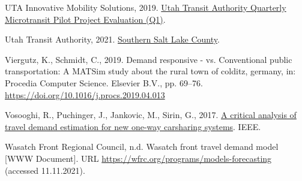 \documentclass[
]{report}
\newlength{\cslhangindent}
\newlength{\cslentryspacingunit} %
\newenvironment{CSLReferences}[2] %
 {%
  \setlength{\parindent}{0pt}
  \ifodd #1
  \let\oldpar\par
  \def\par{\hangindent=\cslhangindent\oldpar}
  \fi
  \setlength{\parskip}{#2\cslentryspacingunit}
 }%
 {}
\begin{document}
\begin{CSLReferences}{1}{0}
\leavevmode{}%
UTA Innovative Mobility Solutions, 2019. \href{https://www.rideuta.com/-/media/Files/About-UTA/Reports/Via/Microtransit_Evaluation_Dec_2019.ashx}{{Utah Transit Authority Quarterly Microtransit Pilot Project Evaluation (Q1)}}.

\leavevmode{}%
Utah Transit Authority, 2021. \href{https://www.rideuta.com/Services/UTA-On-Demand/Southern-Salt-Lake-County}{{Southern Salt Lake County}}.

\leavevmode{}%
Viergutz, K., Schmidt, C., 2019. Demand responsive - vs. Conventional public transportation: A MATSim study about the rural town of colditz, germany, in: Procedia Computer Science. Elsevier B.V., pp. 69--76. \url{https://doi.org/10.1016/j.procs.2019.04.013}

\leavevmode{}%
Vosooghi, R., Puchinger, J., Jankovic, M., Sirin, G., 2017. \href{https://hal.archives-ouvertes.fr/hal-01622293}{A critical analysis of travel demand estimation for new one-way carsharing systems}. IEEE.

\leavevmode{}%
Wasatch Front Regional Council, n.d. Wasatch front travel demand model {[}WWW Document{]}. URL \url{https://wfrc.org/programs/models-forecasting} (accessed 11.11.2021).

\end{CSLReferences}
\end{document}
